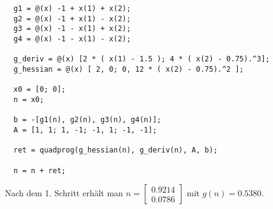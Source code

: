 \documentclass[a4paper, 12pt]{report}
\begin{document}
\begin{lstlisting}
  g1 = @(x) -1 + x(1) + x(2);
  g2 = @(x) -1 + x(1) - x(2);
  g3 = @(x) -1 - x(1) + x(2);
  g4 = @(x) -1 - x(1) - x(2);

  g_deriv = @(x) [2 * ( x(1) - 1.5 ); 4 * ( x(2) - 0.75).^3];
  g_hessian = @(x) [ 2, 0; 0, 12 * ( x(2) - 0.75).^2 ];
  
  x0 = [0; 0];
  n = x0;
  
  b = -[g1(n), g2(n), g3(n), g4(n)];
  A = [1, 1; 1, -1; -1, 1; -1, -1];

  ret = quadprog(g_hessian(n), g_deriv(n), A, b);
  
  n = n + ret;\end{lstlisting}

Nach dem 1. Schritt erhält man $n = \begin{bmatrix}0.9214\\0.0786\end{bmatrix}$ mit $g(n) = 0.5380$.
\end{document}
